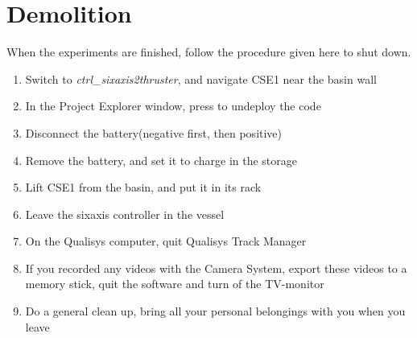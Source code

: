\chapter{Demolition}
When the experiments are finished, follow the procedure given here to shut down. 
\begin{enumerate}
	\item Switch to \textit{ctrl\_sixaxis2thruster}, and navigate CSE1 near the basin wall
	\item In the Project Explorer window, press to undeploy the code
	\item Disconnect the battery(negative first, then positive)
	\item Remove the battery, and set it to charge in the storage
	\item Lift CSE1 from the basin, and put it in its rack
	\item Leave the sixaxis controller in the vessel
	\item On the Qualisys computer, quit Qualisys Track Manager
	\item If you recorded any videos with the Camera System, export these videos to a memory stick, quit the software and turn of the TV-monitor
	\item Do a general clean up, bring all your personal belongings with you when you leave
\end{enumerate}